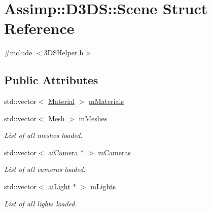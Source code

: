 \hypertarget{struct_assimp_1_1_d3_d_s_1_1_scene}{\section{Assimp\+:\+:D3\+D\+S\+:\+:Scene Struct Reference}
\label{struct_assimp_1_1_d3_d_s_1_1_scene}
}


{\ttfamily \#include $<$3\+D\+S\+Helper.\+h$>$}

\subsection*{Public Attributes}
\begin{DoxyCompactItemize}
\item 
std\+::vector$<$ \hyperlink{struct_assimp_1_1_d3_d_s_1_1_material}{Material} $>$ \hyperlink{struct_assimp_1_1_d3_d_s_1_1_scene_af108cda35d26cce4e0b5e48f6a20e4c1}{m\+Materials}
\item 
\hypertarget{struct_assimp_1_1_d3_d_s_1_1_scene_ad85a895fe86596ebdd226f5dc0e61b92}{std\+::vector$<$ \hyperlink{struct_assimp_1_1_d3_d_s_1_1_mesh}{Mesh} $>$ \hyperlink{struct_assimp_1_1_d3_d_s_1_1_scene_ad85a895fe86596ebdd226f5dc0e61b92}{m\+Meshes}}\label{struct_assimp_1_1_d3_d_s_1_1_scene_ad85a895fe86596ebdd226f5dc0e61b92}

\begin{DoxyCompactList}\small\item\em List of all meshes loaded. \end{DoxyCompactList}\item 
\hypertarget{struct_assimp_1_1_d3_d_s_1_1_scene_ac394924cf750e1650d2c3af653ee6416}{std\+::vector$<$ \hyperlink{structai_camera}{ai\+Camera} $\ast$ $>$ \hyperlink{struct_assimp_1_1_d3_d_s_1_1_scene_ac394924cf750e1650d2c3af653ee6416}{m\+Cameras}}\label{struct_assimp_1_1_d3_d_s_1_1_scene_ac394924cf750e1650d2c3af653ee6416}

\begin{DoxyCompactList}\small\item\em List of all cameras loaded. \end{DoxyCompactList}\item 
\hypertarget{struct_assimp_1_1_d3_d_s_1_1_scene_afeddb701637130d690dffe2f54a5e7ef}{std\+::vector$<$ \hyperlink{structai_light}{ai\+Light} $\ast$ $>$ \hyperlink{struct_assimp_1_1_d3_d_s_1_1_scene_afeddb701637130d690dffe2f54a5e7ef}{m\+Lights}}\label{struct_assimp_1_1_d3_d_s_1_1_scene_afeddb701637130d690dffe2f54a5e7ef}

\begin{DoxyCompactList}\small\item\em List of all lights loaded. \end{DoxyCompactList}\end{DoxyCompactItemize}


